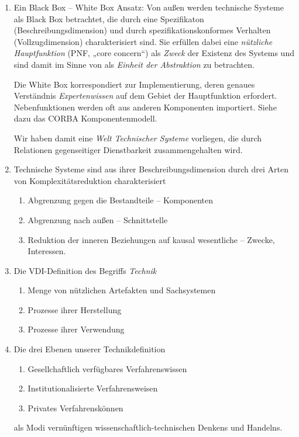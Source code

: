 \documentclass[11pt,a4paper]{article}
\begin{document}
\begin{enumerate}
\item Ein Black Box -- White Box Ansatz: Von außen werden technische Systeme
  als Black Box betrachtet, die durch eine Spezifikaton
  (Beschreibungsdimension) und durch spezifikationskonformes Verhalten
  (Vollzugdimension) charakterisiert sind. Sie erfüllen dabei eine
  \emph{nützliche Hauptfunktion} (PNF, „core concern“) als \emph{Zweck} der
  Existenz des Systems und sind damit im Sinne von \cite{Szyperski2002} als
  \emph{Einheit der Abstraktion} zu betrachten.

  Die White Box korrespondiert zur Implementierung, deren genaues Verständnis
  \emph{Expertenwissen} auf dem Gebiet der Hauptfunktion erfordert.
  Nebenfunktionen werden oft aus anderen Komponenten importiert. Siehe dazu
  das CORBA Komponentenmodell.

  Wir haben damit eine \emph{Welt Technischer Systeme} vorliegen, die durch
  Relationen gegenseitiger Dienstbarkeit zusammengehalten wird.
\item Technische Systeme sind aus ihrer Beschreibungsdimension durch drei
  Arten von Komplexitätsreduktion charakterisiert
\begin{enumerate}[noitemsep]
\item Abgrenzung gegen die Bestandteile -- Komponenten
\item Abgrenzung nach außen -- Schnittstelle
\item Reduktion der inneren Beziehungen auf kausal wesentliche -- Zwecke,
  Interessen.
\end{enumerate}
\item Die VDI-Definition des Begriffs \emph{Technik}
\begin{enumerate}[noitemsep]
\item Menge von nützlichen Artefakten und Sachsystemen
\item Prozesse ihrer Herstellung
\item Prozesse ihrer Verwendung
\end{enumerate}
\item Die drei Ebenen unserer Technikdefinition
\begin{enumerate}[noitemsep]
\item Gesellchaftlich verfügbares Verfahrenswissen
\item Institutionalisierte Verfahrensweisen
\item Privates Verfahrenskönnen
\end{enumerate}
als Modi vernünftigen wissenschaftlich-technischen Denkens und Handelns.
\end{enumerate}
\end{document}
